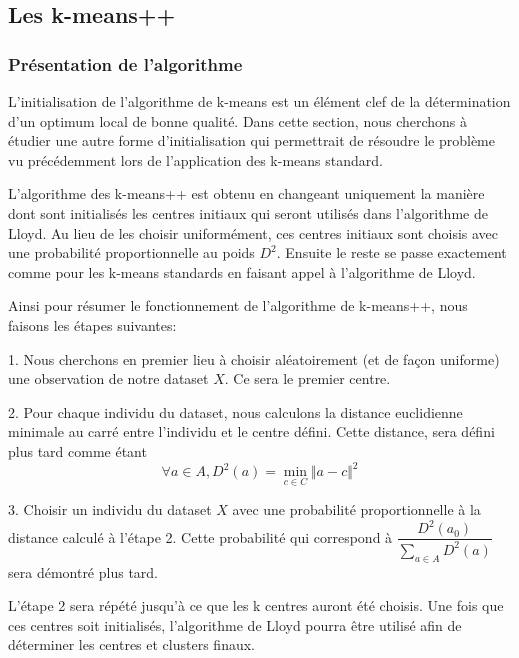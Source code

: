 \documentclass[12pt,a4paper]{book}
\newcommand{\1}{\mathds{1}}
\begin{document}

\subsection{Les k-means++}

\subsubsection{Présentation de l'algorithme}

L'initialisation de l'algorithme de k-means est un élément clef de la détermination d'un optimum local de bonne qualité. Dans cette section, nous cherchons à étudier une autre forme d'initialisation qui permettrait de résoudre le problème vu précédemment lors de l'application des k-means standard.

L'algorithme des k-means++ est obtenu en changeant uniquement la manière dont sont initialisés les centres initiaux qui seront utilisés dans l'algorithme de Lloyd. Au lieu de les choisir uniformément, ces centres initiaux sont choisis avec une probabilité proportionnelle au poids $D^2$. Ensuite le reste se passe exactement comme pour les k-means standards en faisant appel à l'algorithme de Lloyd. 

Ainsi pour résumer le fonctionnement de l'algorithme de k-means++, nous faisons les étapes suivantes:
\begin{description}
  \item 1. Nous cherchons en premier lieu à choisir aléatoirement (et de façon uniforme) une observation de notre dataset $X$. Ce sera le premier centre.
  \item 2. Pour chaque individu du dataset, nous calculons la distance euclidienne minimale au carré entre l'individu et le centre défini. Cette distance, sera défini plus tard comme étant $$
			\forall a \in A, D^2(a) = \min_{c \in C} \Vert a-c \Vert^2
		$$
  \item 3. Choisir un individu du dataset $X$ avec une probabilité proportionnelle à la distance calculé à l'étape 2. Cette probabilité qui correspond à $\dfrac{D^2(a_0)}{\displaystyle \sum_{a \in A} D^2(a)}$ sera démontré plus tard.

  \end{description}
L'étape 2 sera répété jusqu'à ce que les k centres auront été choisis. Une fois que ces centres soit initialisés, l'algorithme de Lloyd pourra être utilisé afin de déterminer les centres et clusters finaux.
  
\end{document}
